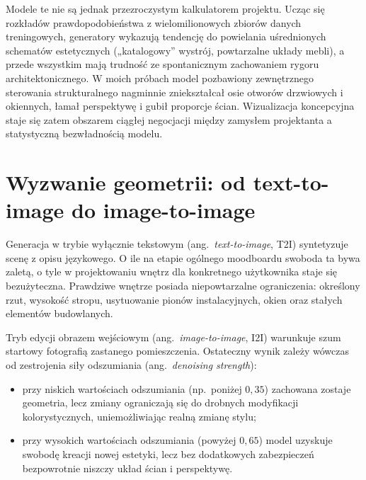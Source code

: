 Modele te nie są jednak przezroczystym kalkulatorem projektu. Ucząc się rozkładów prawdopodobieństwa z wielomilionowych zbiorów danych treningowych, generatory wykazują tendencję do powielania uśrednionych schematów estetycznych („katalogowy” wystrój, powtarzalne układy mebli), a przede wszystkim mają trudność ze spontanicznym zachowaniem rygoru architektonicznego. W moich próbach model pozbawiony zewnętrznego sterowania strukturalnego nagminnie zniekształcał osie otworów drzwiowych i okiennych, łamał perspektywę i gubił proporcje ścian. Wizualizacja koncepcyjna staje się zatem obszarem ciągłej negocjacji między zamysłem projektanta a statystyczną bezwładnością modelu.

\section{Wyzwanie geometrii: od text-to-image do image-to-image}
\label{ch04:sec:t2i-i2i}

Generacja w trybie wyłącznie tekstowym (ang.\ \emph{text-to-image}, T2I) syntetyzuje scenę z opisu językowego. O ile na etapie ogólnego moodboardu swoboda ta bywa zaletą, o tyle w projektowaniu wnętrz dla konkretnego użytkownika staje się bezużyteczna. Prawdziwe wnętrze posiada niepowtarzalne ograniczenia: określony rzut, wysokość stropu, usytuowanie pionów instalacyjnych, okien oraz stałych elementów budowlanych.

Tryb edycji obrazem wejściowym (ang.\ \emph{image-to-image}, I2I) warunkuje szum startowy fotografią zastanego pomieszczenia. Ostateczny wynik zależy wówczas od zestrojenia siły odszumiania (ang.\ \emph{denoising strength}):
\begin{itemize}
  \item przy niskich wartościach odszumiania (np.\ poniżej $0{,}35$) zachowana zostaje geometria, lecz zmiany ograniczają się do drobnych modyfikacji kolorystycznych, uniemożliwiając realną zmianę stylu;
  \item przy wysokich wartościach odszumiania (powyżej $0{,}65$) model uzyskuje swobodę kreacji nowej estetyki, lecz bez dodatkowych zabezpieczeń bezpowrotnie niszczy układ ścian i perspektywę.
\end{itemize}

